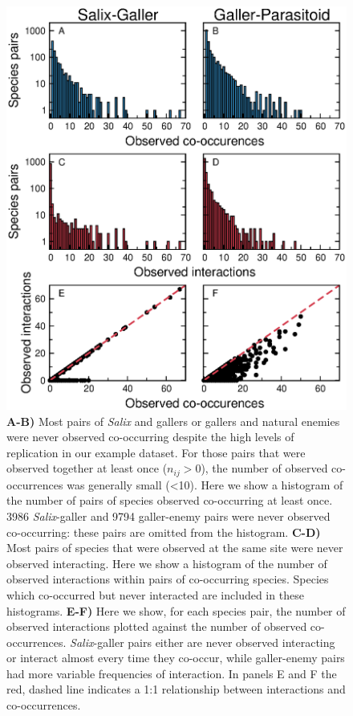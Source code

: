 \documentclass[12pt]{article}
\begin{document}
    \begin{figure}
      \caption{\textbf{A-B)} Most pairs of \emph{Salix} and gallers or gallers and natural enemies were never observed co-occurring despite the high levels of replication in our example dataset. For those pairs that were observed together at least once ($n_{ij}>0$), the number of observed co-occurrences was generally small (\textless10). Here we show a histogram of the number of pairs of species observed co-occurring at least once. 3986 \emph{Salix}-galler and 9794 galler-enemy pairs were never observed co-occurring: these pairs are omitted from the histogram. \textbf{C-D)} Most pairs of species that were observed at the same site were never observed interacting. Here we show a histogram of the number of observed interactions within pairs of co-occurring species. Species which co-occurred but never interacted are included in these histograms. \textbf{E-F)} Here we show, for each species pair, the number of observed interactions plotted against the number of observed co-occurrences. \emph{Salix}-galler pairs either are never observed interacting or interact almost every time they co-occur, while galler-enemy pairs had more variable frequencies of interaction. In panels E and F the red, dashed line indicates a 1:1 relationship between interactions and co-occurrences.}
      \label{histograms}
      \includegraphics*[width=.8\textwidth]{figures/Salix_Galler_histogram.eps}
      \end{figure}
\end{document}
